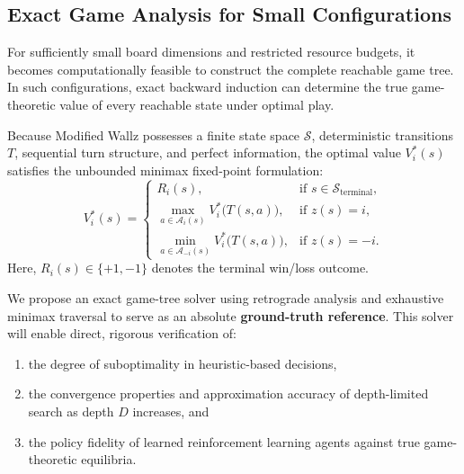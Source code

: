 \documentclass{article}
\begin{document}
\subsection{Exact Game Analysis for Small Configurations}
\label{subsec:exact_analysis}

For sufficiently small board dimensions and restricted resource budgets, it becomes computationally feasible to construct the complete reachable game tree. In such configurations, exact backward induction can determine the true game-theoretic value of every reachable state under optimal play.

Because Modified Wallz possesses a finite state space $\mathcal{S}$, deterministic transitions $T$, sequential turn structure, and perfect information, the optimal value $V_i^*(s)$ satisfies the unbounded minimax fixed-point formulation:
\begin{equation}
V_i^*(s) = \begin{cases}
R_i(s), & \text{if } s \in \mathcal{S}_{\text{terminal}}, \\
\max\limits_{a \in \mathcal{A}_i(s)} V_i^*\big(T(s, a)\big), & \text{if } z(s) = i, \\
\min\limits_{a \in \mathcal{A}_{-i}(s)} V_i^*\big(T(s, a)\big), & \text{if } z(s) = -i.
\end{cases}
\end{equation}
Here, $R_i(s) \in \{+1, -1\}$ denotes the terminal win/loss outcome.

We propose an exact game-tree solver using retrograde analysis and exhaustive minimax traversal to serve as an absolute \textbf{ground-truth reference}. This solver will enable direct, rigorous verification of:
\begin{enumerate}
    \item the degree of suboptimality in heuristic-based decisions,
    \item the convergence properties and approximation accuracy of depth-limited search as depth $D$ increases, and
    \item the policy fidelity of learned reinforcement learning agents against true game-theoretic equilibria.
\end{enumerate}
\end{document}
